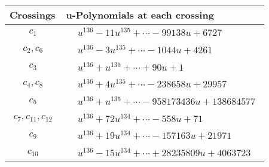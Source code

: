 \documentclass[1p]{elsarticle_modified}
\theoremstyle{definition}
\begin{document}
\begin{tabular}{m{50pt}|m{274pt}}
Crossings & \hspace{64pt}u-Polynomials at each crossing \\
\hline $$\begin{aligned}c_{1}\end{aligned}$$&$\begin{aligned}
&u^{136}-11 u^{135}+\cdots-99138 u+6727
\end{aligned}$\\
\hline $$\begin{aligned}c_{2},c_{6}\end{aligned}$$&$\begin{aligned}
&u^{136}-3 u^{135}+\cdots-1044 u+4261
\end{aligned}$\\
\hline $$\begin{aligned}c_{3}\end{aligned}$$&$\begin{aligned}
&u^{136}+u^{135}+\cdots+90 u+1
\end{aligned}$\\
\hline $$\begin{aligned}c_{4},c_{8}\end{aligned}$$&$\begin{aligned}
&u^{136}+4 u^{135}+\cdots-238658 u+29957
\end{aligned}$\\
\hline $$\begin{aligned}c_{5}\end{aligned}$$&$\begin{aligned}
&u^{136}+u^{135}+\cdots-958173436 u+138684577
\end{aligned}$\\
\hline $$\begin{aligned}c_{7},c_{11},c_{12}\end{aligned}$$&$\begin{aligned}
&u^{136}+72 u^{134}+\cdots-558 u+71
\end{aligned}$\\
\hline $$\begin{aligned}c_{9}\end{aligned}$$&$\begin{aligned}
&u^{136}+19 u^{134}+\cdots-157163 u+21971
\end{aligned}$\\
\hline $$\begin{aligned}c_{10}\end{aligned}$$&$\begin{aligned}
&u^{136}-15 u^{134}+\cdots+28235809 u+4063723
\end{aligned}$\\
\hline
\end{tabular}\\~\\
\end{document}
